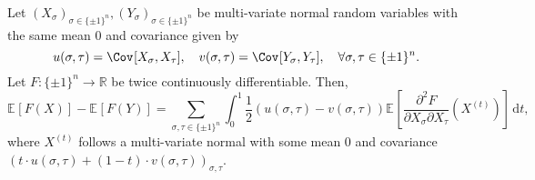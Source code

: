 \begin{theorem}
	Let \((X_\sigma )_{\sigma \in \{ \pm 1 \} ^n}, (Y_\sigma )_{\sigma \in \{ \pm 1 \} ^n}\) be multi-variate normal random variables with the same mean \(0\) and covariance given by
	\[
		u(\sigma , \tau ) = \Cov_{}[X_\sigma , X_\tau ] ,\quad
		v(\sigma , \tau ) = \Cov_{}[Y_\sigma , Y_\tau ] ,\quad
		\forall \sigma , \tau \in \{ \pm 1 \} ^n.
	\]
	Let \(F \colon \{ \pm 1 \} ^n \to \mathbb{R} \) be twice continuously differentiable. Then,
	\[
		\mathbb{E}_{}[F(X)] - \mathbb{E}_{}[F(Y)]
		= \sum_{\sigma , \tau \in \{ \pm 1 \} ^n}  \int_{0}^{1} \frac{1}{2} (u(\sigma , \tau ) - v(\sigma , \tau )) \mathbb{E}_{}\left[\frac{\partial ^2 F}{\partial X_\sigma \partial X_\tau } (X^{(t)}) \right]  \,\mathrm{d}t,
	\]
	where \(X^{(t)}\) follows a multi-variate normal with some mean \(0\) and covariance \((t \cdot u(\sigma , \tau ) + (1 - t) \cdot v(\sigma , \tau ))_{\sigma , \tau }\).
\end{theorem}
